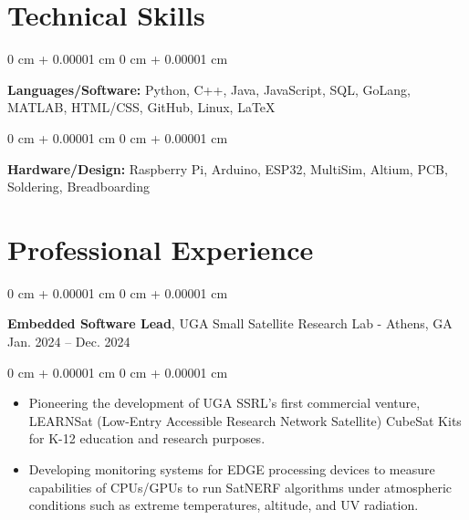 \documentclass[10pt, letterpaper]{article}
\newenvironment{highlights}{
    \begin{itemize}[
        topsep=0.10 cm,
        parsep=0.10 cm,
        partopsep=0pt,
        itemsep=0pt,
        leftmargin=0 cm + 10pt
    ]
}{
    \end{itemize}
} %
\newenvironment{onecolentry}{
    \begin{adjustwidth}{
        0 cm + 0.00001 cm
    }{
        0 cm + 0.00001 cm
    }
}{
    \end{adjustwidth}
} %
\newenvironment{twocolentry}[2][]{
    \onecolentry
    \def\secondColumn{#2}
    \setcolumnwidth{\fill, 4.5 cm}
    \begin{paracol}{2}
}{
    \switchcolumn \raggedleft \secondColumn
    \end{paracol}
    \endonecolentry
} %
\begin{document}
        
        
        

    \section{Technical Skills}
        
        \begin{onecolentry}
            \textbf{Languages/Software:} Python, C++, Java, JavaScript, SQL, GoLang, MATLAB, HTML/CSS, GitHub, Linux, LaTeX
        \end{onecolentry}
        \begin{onecolentry}
            \textbf{Hardware/Design:} Raspberry Pi, Arduino, ESP32, MultiSim, Altium, PCB, Soldering, Breadboarding
        \end{onecolentry}

    \section{Professional Experience}
        
        \begin{twocolentry}{
            Jan. 2024 – Dec. 2024
        }
            \textbf{Embedded Software Lead}, UGA Small Satellite Research Lab - Athens, GA\end{twocolentry}

        \vspace{0.10 cm}
        \begin{onecolentry}
            \begin{highlights}
                \item Pioneering the development of UGA SSRL’s first commercial venture, LEARNSat (Low-Entry Accessible Research Network Satellite) CubeSat Kits for K-12 education and research purposes. 

                \item Developing monitoring systems for EDGE processing devices to measure capabilities of CPUs/GPUs to run SatNERF algorithms under atmospheric conditions such as extreme temperatures, altitude, and UV radiation. 

                
            \end{highlights}
        \end{onecolentry}
\end{document}
